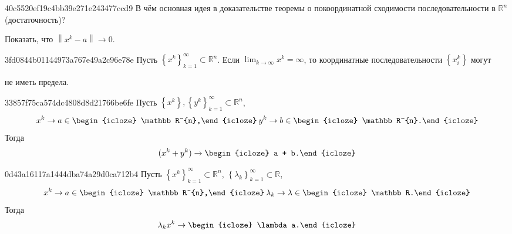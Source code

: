 \begin{note}{40c5520ef19c4bb39e271e243477ccd9}
    В чём основная идея в доказательстве теоремы о покоординатной сходимости последовательности в \({ \mathbb R^{n} }\) (достаточность)?

    \begin{cloze}{1}
        Показать, что \({ \left\lVert x^{k} - a \right\rVert \to 0 }\).
    \end{cloze}
\end{note}

\begin{note}{3fd0844b01144973a767e49a2c96e78e}
    Пусть \({ \left\{ x^{k} \right\}_{k = 1}^{\infty} \subset \mathbb R^{n} }\).
    Если \({ \displaystyle \lim_{k \to \infty} x^{k} = \infty }\), то координатные последовательности \({ \left\{ x_i^{k} \right\} }\) могут \begin{icloze}{1}не иметь предела.\end{icloze}
\end{note}

\begin{note}{33857f75ca574dc4808d8d21766be6fe}
    Пусть \({ \left\{ x^{k} \right\}, \left\{ y^{k} \right\}_{k = 1}^{\infty} \subset \mathbb R^{n} }\),
    \[
        x^{k} \to a \in \begin{icloze}{2}\mathbb R^{n},\end{icloze}\: y^{k} \to b \in \begin{icloze}{2}\mathbb R^{n}.\end{icloze}
    \]
    Тогда
    \[
        (x^{k} +  y^{k}) \to \begin{icloze}{1}a + b.\end{icloze}
    \]
\end{note}

\begin{note}{0d43a16117a1444dba74a29d0ca712b4}
    Пусть \({ \left\{ x^{k} \right\}_{k = 1}^{\infty} \subset \mathbb R^{n} }\), \({ \left\{ \lambda_k \right\}_{k = 1}^{\infty} \subset \mathbb R }\),
    \[
        x^{k} \to a \in \begin{icloze}{2}\mathbb R^{n},\end{icloze}\: \lambda_k \to \lambda \in \begin{icloze}{2}\mathbb R.\end{icloze}
    \]
    Тогда
    \[
        \lambda_k x^{k} \to \begin{icloze}{1}\lambda a.\end{icloze}
    \]
\end{note}

